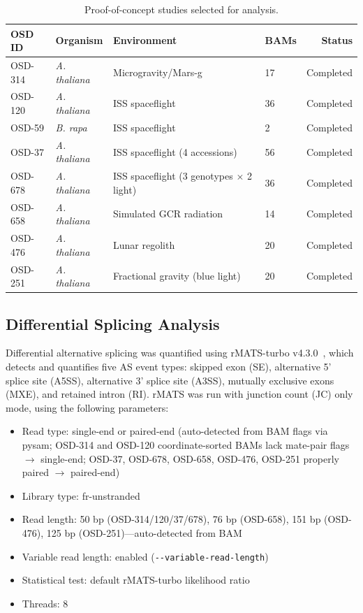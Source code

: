 \documentclass[12pt,a4paper]{article}
\begin{document}
\begin{table}[h]
\centering
\caption{Proof-of-concept studies selected for analysis.}
\label{tab:studies}
\begin{tabularx}{\textwidth}{llXlr}
\toprule
\textbf{OSD ID} & \textbf{Organism} & \textbf{Environment} & \textbf{BAMs} & \textbf{Status} \\
\midrule
OSD-314 & \textit{A. thaliana} & Microgravity/Mars-g & 17 & Completed \\
OSD-120 & \textit{A. thaliana} & ISS spaceflight & 36 & Completed \\
OSD-59 & \textit{B. rapa} & ISS spaceflight & 2 & Completed \\
OSD-37 & \textit{A. thaliana} & ISS spaceflight (4 accessions) & 56 & Completed \\
OSD-678 & \textit{A. thaliana} & ISS spaceflight (3 genotypes $\times$ 2 light) & 36 & Completed \\
OSD-658 & \textit{A. thaliana} & Simulated GCR radiation & 14 & Completed \\
OSD-476 & \textit{A. thaliana} & Lunar regolith & 20 & Completed \\
OSD-251 & \textit{A. thaliana} & Fractional gravity (blue light) & 20 & Completed \\
\bottomrule
\end{tabularx}
\end{table}

\subsection{Differential Splicing Analysis}

Differential alternative splicing was quantified using rMATS-turbo v4.3.0~\cite{rmats_turbo}, which detects and quantifies five AS event types: skipped exon (SE), alternative 5' splice site (A5SS), alternative 3' splice site (A3SS), mutually exclusive exons (MXE), and retained intron (RI). rMATS was run with junction count (JC) only mode, using the following parameters:

\begin{itemize}
\item Read type: single-end or paired-end (auto-detected from BAM flags via pysam; OSD-314 and OSD-120 coordinate-sorted BAMs lack mate-pair flags $\rightarrow$ single-end; OSD-37, OSD-678, OSD-658, OSD-476, OSD-251 properly paired $\rightarrow$ paired-end)
\item Library type: fr-unstranded
\item Read length: 50 bp (OSD-314/120/37/678), 76 bp (OSD-658), 151 bp (OSD-476), 125 bp (OSD-251)---auto-detected from BAM
\item Variable read length: enabled (\texttt{-{}-variable-read-length})
\item Statistical test: default rMATS-turbo likelihood ratio
\item Threads: 8
\end{itemize}
\end{document}
